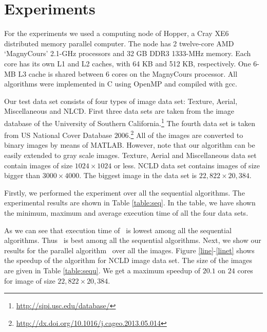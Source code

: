 \vspace{\sectionSpace}
\section{Experiments}
\label{sec:experiments}



For the experiments we used a computing node of Hopper, a Cray XE6 distributed memory parallel computer. 
The node has 2 twelve-core AMD ‘MagnyCours’ 2.1-GHz processors and 32 GB DDR3 1333-MHz memory. 
Each core has its own L1 and L2 caches, with 64 KB and 512 KB, respectively. 
One 6-MB L3 cache is shared between 6 cores on the MagnyCours processor. 
All algorithms were implemented in C using OpenMP and compiled with gcc.

Our test data set consists of four types of image data set: Texture, Aerial,
Miscellaneous and NLCD. First three data sets are taken from the image database of the University of 
Southern
California.\footnote{\url{http://sipi.usc.edu/database/}} 
The fourth data set is taken from US National Cover Database
$2006$.\footnote{\url{http://dx.doi.org/10.1016/j.cageo.2013.05.014}} All of the
images are converted to binary images by means of MATLAB. However, note that our
algorithm can be easily extended to gray scale images.
Texture, Aerial and Miscellaneous data set contain images of size $1024 \times
1024$ or less.
NCLD data set contains images of size bigger than $3000 \times
4000$. The biggest image in the data set is $22,822 \times 20,384$.

Firstly, we performed the experiment over all the sequential algorithms. The
experimental results are shown in Table \ref{table:seq}. In the table, we have
shown the minimum, maximum and average execution time of all the four data sets. 





As we can see that execution time of \aremsp\ is lowest among all
the sequential algorithms. Thus \aremsp\ is best among all the sequential
algorithms.
Next, we show our results for the parallel algorithm \paremsp\ over all the images.
Figure \ref{line}-\ref{linet} shows the speedup of the algorithm for 
NCLD image data set. The size of the images are given in Table \ref{table:sequ}.
We get a maximum speedup of $20.1$ on $24$ cores for image of size $22,822
\times 20,384$.

